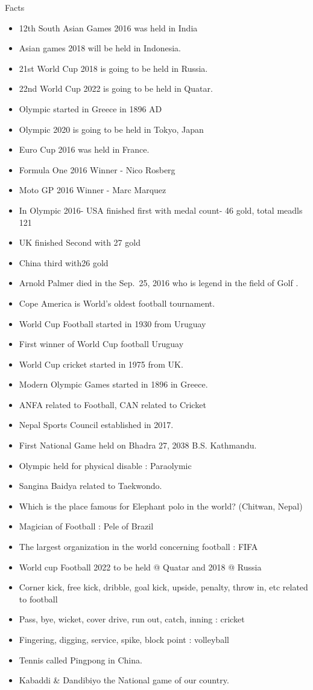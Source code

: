 \documentclass[
  openany]{book}
\providecommand{\tightlist}{%
  \setlength{\itemsep}{0pt}\setlength{\parskip}{0pt}}
\begin{document}
Facts

\begin{itemize}
\tightlist
\item
  12th South Asian Games 2016 was held in India
\item
  Asian games 2018 will be held in Indonesia.
\item
  21st World Cup 2018 is going to be held in Russia.
\item
  22nd World Cup 2022 is going to be held in Quatar.
\item
  Olympic started in Greece in 1896 AD
\item
  Olympic 2020 is going to be held in Tokyo, Japan
\item
  Euro Cup 2016 was held in France.
\item
  Formula One 2016 Winner - Nico Rosberg
\item
  Moto GP 2016 Winner - Marc Marquez
\item
  In Olympic 2016- USA finished first with medal count- 46 gold, total meadls 121
\item
  UK finished Second with 27 gold
\item
  China third with26 gold
\item
  Arnold Palmer died in the Sep.~25, 2016 who is legend in the field of Golf .
\item
  Cope America is World's oldest football tournament.
\item
  World Cup Football started in 1930 from Uruguay
\item
  First winner of World Cup football Uruguay
\item
  World Cup cricket started in 1975 from UK.
\item
  Modern Olympic Games started in 1896 in Greece.
\item
  ANFA related to Football, CAN related to Cricket
\item
  Nepal Sports Council established in 2017.
\item
  First National Game held on Bhadra 27, 2038 B.S. Kathmandu.
\item
  Olympic held for physical disable : Paraolymic
\item
  Sangina Baidya related to Taekwondo.
\item
  Which is the place famous for Elephant polo in the world? (Chitwan, Nepal)
\item
  Magician of Football : Pele of Brazil
\item
  The largest organization in the world concerning football : FIFA
\item
  World cup Football 2022 to be held @ Quatar and 2018 @ Russia
\item
  Corner kick, free kick, dribble, goal kick, upside, penalty, throw in, etc related to football
\item
  Pass, bye, wicket, cover drive, run out, catch, inning : cricket
\item
  Fingering, digging, service, spike, block point : volleyball
\item
  Tennis called Pingpong in China.
\item
  Kabaddi \& Dandibiyo the National game of our country.
\end{itemize}
\end{document}
